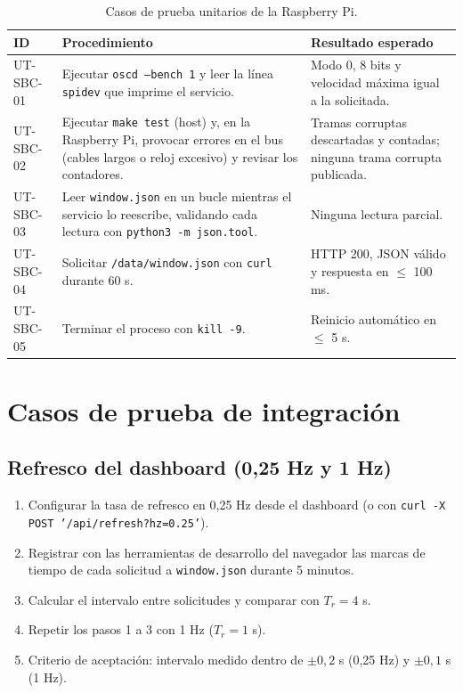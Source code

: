 \documentclass[12pt,a4paper]{article}
\begin{document}
\begin{table}[H]
\centering
\small
\begin{tabular}{@{}p{2.2cm} p{5.3cm} p{6.3cm}@{}}
\toprule
\textbf{ID} & \textbf{Procedimiento} & \textbf{Resultado esperado} \\
\midrule
UT-SBC-01 & Ejecutar \texttt{oscd --bench 1} y leer la línea \texttt{spidev} que imprime el servicio. & Modo 0, 8 bits y velocidad máxima igual a la solicitada. \\
UT-SBC-02 & Ejecutar \texttt{make test} (host) y, en la Raspberry Pi, provocar errores en el bus (cables largos o reloj excesivo) y revisar los contadores. & Tramas corruptas descartadas y contadas; ninguna trama corrupta publicada. \\
UT-SBC-03 & Leer \texttt{window.json} en un bucle mientras el servicio lo reescribe, validando cada lectura con \texttt{python3 -m json.tool}. & Ninguna lectura parcial. \\
UT-SBC-04 & Solicitar \texttt{/data/window.json} con \texttt{curl} durante 60 s. & HTTP 200, JSON válido y respuesta en $\leq$ 100 ms. \\
UT-SBC-05 & Terminar el proceso con \texttt{kill -9}. & Reinicio automático en $\leq$ 5 s. \\
\bottomrule
\end{tabular}
\caption{Casos de prueba unitarios de la Raspberry Pi.}
\end{table}

\section{Casos de prueba de integración}

\subsection{Refresco del dashboard (0{,}25 Hz y 1 Hz)}

\begin{enumerate}
  \item Configurar la tasa de refresco en 0{,}25 Hz desde el dashboard (o con \texttt{curl -X POST '/api/refresh?hz=0.25'}).
  \item Registrar con las herramientas de desarrollo del navegador las marcas de tiempo de cada solicitud a \texttt{window.json} durante 5 minutos.
  \item Calcular el intervalo entre solicitudes y comparar con $T_r = 4$ s.
  \item Repetir los pasos 1 a 3 con 1 Hz ($T_r = 1$ s).
  \item Criterio de aceptación: intervalo medido dentro de $\pm 0{,}2$ s (0{,}25 Hz) y $\pm 0{,}1$ s (1 Hz).
\end{enumerate}
\end{document}
